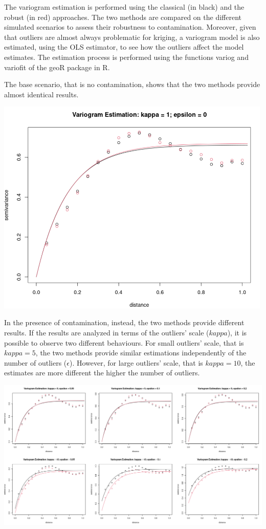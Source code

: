 \documentclass[
  12pt]{article}
\begin{document}
The variogram estimation is performed using the classical (in black) and
the robust (in red) approaches. The two methods are compared on the
different simulated scenarios to assess their robustness to
contamination. Moreover, given that outliers are almost always
problematic for kriging, a variogram model is also estimated, using the
OLS estimator, to see how the outliers affect the model estimates. The
estimation process is performed using the functions variog and variofit
of the geoR package in R.

The base scenario, that is no contamination, shows that the two methods
provide almost identical results.

\begin{center}
\includegraphics[width=5.20833in,height=\textheight]{img/variog_grf_ols.png}
\end{center}

In the presence of contamination, instead, the two methods provide
different results. If the results are analyzed in terms of the outliers'
scale (\(kappa\)), it is possible to observe two different behaviours.
For small outliers' scale, that is \(kappa = 5\), the two methods
provide similar estimations independently of the number of outliers
(\(\epsilon\)). However, for large outliers' scale, that is
\(kappa = 10\), the estimates are more different the higher the number
of outliers.

\begin{center}
\includegraphics[width=6.25in,height=\textheight]{img/variog_cgrf_ols.png}
\end{center}
\end{document}
